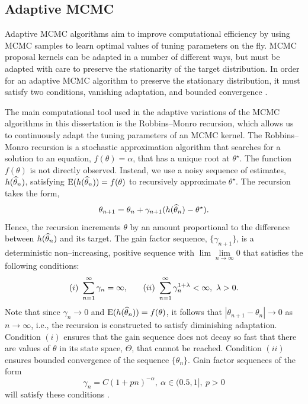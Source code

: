 \subsection{Adaptive MCMC}
\label{subsec:adaptive_mcmc}

Adaptive MCMC algorithms aim to improve computational efficiency by using MCMC samples to learn optimal values of tuning parameters on the fly. MCMC proposal kernels can be adapted in a number of different ways, but must be adapted with care to preserve the stationarity of the target distribution. In order for an adaptive MCMC algorithm to preserve the stationary distribution, it must satisfy two conditions, vanishing adaptation, and bounded convergence \cite{andrieu2008tutorial}.

The main computational tool used in the adaptive variations of the MCMC algorithms in this dissertation is the Robbins--Monro recursion, which allows us to continuously adapt the tuning parameters of an MCMC kernel. The Robbins--Monro recursion is a stochastic approximation algorithm that searches for a solution to an equation, $ f(\theta) = \alpha $, that has a unique root at $ \theta^\star $. The function $ f(\theta) $ is not directly observed. Instead, we use a noisy sequence of estimates, $ h(\widehat{\theta}_n) $, satisfying $ \mathrm{E}(h(\widehat{\theta}_n)) = f(\theta) $ to recursively approximate $ \theta^\star $. The recursion takes the form, $$\theta_{n+1} = \theta_n + \gamma_{n+1}(h(\widehat{\theta}_n) - \theta^\star).$$
Hence, the recursion increments $ \theta $ by an amount proportional to the difference between $ h(\widehat{\theta}_n) $ and its target.  The gain factor sequence, $ \lbrace\gamma_{n+1}\rbrace $, is a deterministic non--increasing, positive sequence with $ \lim\lim\limits_{n\rightarrow\infty}0 $ that satisfies the following conditions: $$(i)\ \sum_{n=1}^\infty \gamma_n = \infty,\hspace{0.25in} (ii)\  \sum_{n=1}^\infty\gamma_n^{1+\lambda} < \infty,\ \lambda > 0.$$
Note that since $ \gamma_n\rightarrow0 $ and $ \mathrm{E}(h(\widehat{\theta}_n))= f(\theta) $, it follows that $ |\theta_{n+1} - \theta_n|\rightarrow0 $ as $ n\rightarrow\infty $, i.e., the recursion is constructed to satisfy diminishing adaptation. Condition $ (i) $ ensures that the gain sequence does not decay so fast that there are values of $ \theta $ in its state space, $ \Theta $, that cannot be reached. Condition $ (ii) $ ensures bounded convergence of the sequence $ \lbrace\theta_n\rbrace $. Gain factor sequences of the form \begin{equation}
\label{eqn:gain_factor_seq}
 \gamma_n = C(1+pn)^{-\alpha},\ \alpha\in(0.5,1],\ p>0
\end{equation}  will satisfy these conditions \cite{andrieu2008tutorial,liang2011advanced}. 

